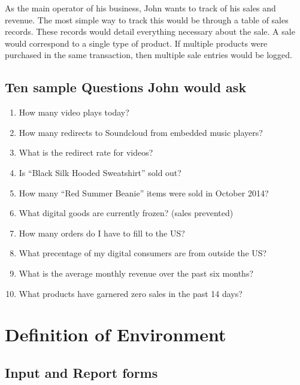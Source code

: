\documentclass[11pt, a4paper]{report}
\begin{document}
As the main operator of his business, John wants to track of his sales and revenue. The most simple way to track this would be through a table of sales records. These records would detail everything necessary about the sale. A sale would correspond to a single type of product. If multiple products were purchased in the same transaction, then multiple sale entries would be logged.\\

\clearpage
\section{Ten sample Questions John would ask}
\begin{enumerate}
    \item How many video plays today?
    \item How many redirects to Soundcloud from embedded music players?
    \item What is the redirect rate for videos?
    \item Is ``Black Silk Hooded Sweatshirt'' sold out?
    \item How many ``Red Summer Beanie'' items were sold in October 2014?
    \item What digital goods are currently frozen? (sales prevented)
    \item How many orders do I have to fill to the US?
    \item What precentage of my digital consumers are from outside the US?
    \item What is the average monthly revenue over the past six months?
    \item What products have garnered zero sales in the past 14 days? 
\end{enumerate}

\chapter{Definition of Environment}

\section{Input and Report forms}
\end{document}
